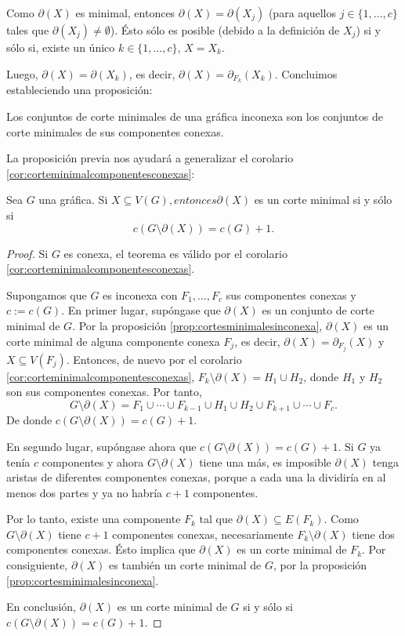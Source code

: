 Como $\partial(X)$ es minimal, entonces $\partial(X) = \partial(X_{j})$ (para aquellos $j\in\{1, \ldots, c\}$ tales que $\partial(X_{j}) \neq \emptyset$). Ésto sólo es posible (debido a la definición de $X_{j}$) si y sólo si, existe un único $k\in\{1, \ldots, c\}$, $X = X_{k}$.

Luego, $ \partial(X)= \partial(X_{k})$, es decir, $\partial(X)=\partial_{F_{k}}(X_{k})$. Concluimos estableciendo una proposición:
\begin{prop}\label{prop:cortesminimalesinconexa}
Los conjuntos de corte minimales de una gráfica inconexa son los conjuntos de corte minimales de sus componentes conexas. 
\end{prop}

La proposición previa nos ayudará a generalizar el corolario \ref{cor:corteminimalcomponentesconexas}:

\begin{teo} \label{teo:caracterizacionbond2}
Sea $G$ una gráfica. Si $X\subseteq V(G)$$, entonces $$\partial(X)$ es un corte minimal si y sólo si $$c(G\setminus \partial(X)) = c(G) + 1.$$
\end{teo}

\begin{proof}
Si $G$ es conexa, el teorema es válido por el corolario \ref{cor:corteminimalcomponentesconexas}.

Supongamos que $G$ es inconexa con $F_{1},\ldots,F_{c}$ sus componentes conexas y $c:=c(G)$. En primer lugar, supóngase que $\partial(X)$ es un conjunto de corte minimal de $G$. Por la proposición \ref{prop:cortesminimalesinconexa}, $\partial(X)$ es un corte minimal de alguna componente conexa $F_{j}$, es decir, $\partial(X) = \partial_{F_{j}}(X)$ y $X\subseteq V(F_{j})$. Entonces, de nuevo por el corolario \ref{cor:corteminimalcomponentesconexas},
$F_{k}\setminus \partial(X) = H_{1}\cup H_{2}$, donde $H_{1}$ y $H_{2}$ son sus componentes conexas. Por tanto, $$G\setminus \partial(X) = F_{1}\cup \cdots \cup F_{k-1}\cup H_{1} \cup H_{2}\cup F_{k+1}\cup\cdots \cup F_{c}.$$
De donde $c(G\setminus \partial(X)) = c(G) + 1$.

En segundo lugar, supóngase ahora que $c(G\setminus \partial(X)) = c(G) + 1.$ Si $G$ ya tenía $c$ componentes y ahora $G\setminus \partial(X)$ tiene una más, es imposible $\partial(X)$ tenga aristas de diferentes componentes conexas, porque a cada una la dividiría en al  menos dos partes y ya no habría $c+1$ componentes.

Por lo tanto, existe una componente $F_{k}$ tal que $\partial(X) \subseteq E(F_{k})$. Como $G\setminus \partial(X)$ tiene $c+1$ componentes conexas, necesariamente $F_{k}\setminus \partial(X)$ tiene dos componentes conexas. Ésto implica que $\partial(X)$ es un corte minimal de $F_{k}$. Por consiguiente, $\partial(X)$ es también un corte minimal de $G$, por la proposición \ref{prop:cortesminimalesinconexa}.

En conclusión, $\partial(X)$ es un corte minimal de $G$ si y sólo si $c(G\setminus \partial(X)) = c(G) + 1$.


\end{proof}
 

